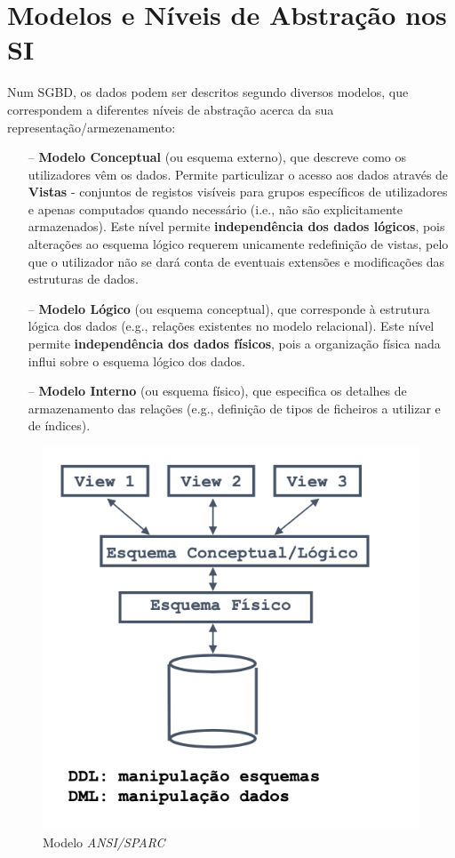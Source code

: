 \documentclass[oneside]{book}
\theoremstyle{definition}
\begin{document}
\section{Modelos e Níveis de Abstração nos SI}

Num SGBD, os dados podem ser descritos segundo diversos modelos, que correspondem a diferentes níveis de abstração acerca da sua representação/armezenamento:
\begin{itemize}
    \itemsep0cm
    \item[--]\textbf{Modelo Conceptual} (ou esquema externo), que descreve como os utilizadores vêm os dados. Permite particulizar o acesso aos dados através de \textbf{Vistas} - conjuntos de registos visíveis para grupos específicos de utilizadores e apenas computados quando necessário (i.e., não são explicitamente armazenados). Este nível permite \textbf{independência dos dados lógicos}, pois alterações ao esquema lógico requerem unicamente redefinição de vistas, pelo que o utilizador não se dará conta de eventuais extensões e modificações das estruturas de dados.
    \item[--]\textbf{Modelo Lógico} (ou esquema conceptual), que corresponde à estrutura lógica dos dados (e.g., relações existentes no modelo relacional). Este nível permite \textbf{independência dos dados físicos}, pois a organização física nada influi sobre o esquema lógico dos dados.
    \item[--]\textbf{Modelo Interno} (ou esquema físico), que especifica os detalhes de armazenamento das relações (e.g., definição de tipos de ficheiros a utilizar e de índices). 
\end{itemize}
\begin{figure}[H]
    \centering
    \includegraphics[scale = 0.6]{cap1/modelo_ansi.png}
    \caption{Modelo \textit{ANSI/SPARC}}
\end{figure}
\end{document}

